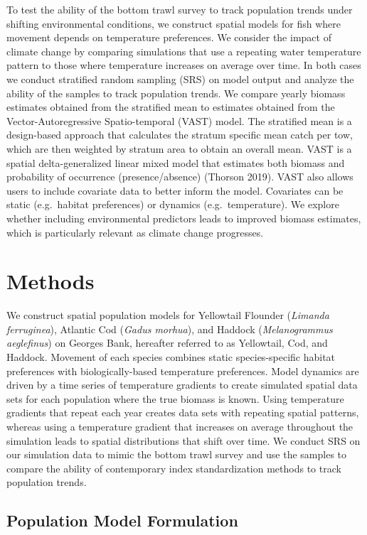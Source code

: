 \documentclass[
  12pt,
]{article}
\begin{document}
To test the ability of the bottom trawl survey to track population trends under shifting environmental conditions, we construct spatial models for fish where movement depends on temperature preferences. We consider the impact of climate change by comparing simulations that use a repeating water temperature pattern to those where temperature increases on average over time. In both cases we conduct stratified random sampling (SRS) on model output and analyze the ability of the samples to track population trends. We compare yearly biomass estimates obtained from the stratified mean to estimates obtained from the Vector-Autoregressive Spatio-temporal (VAST) model. The stratified mean is a design-based approach that calculates the stratum specific mean catch per tow, which are then weighted by stratum area to obtain an overall mean. VAST is a spatial delta-generalized linear mixed model that estimates both biomass and probability of occurrence (presence/absence) (Thorson 2019). VAST also allows users to include covariate data to better inform the model. Covariates can be static (e.g.~habitat preferences) or dynamics (e.g.~temperature). We explore whether including environmental predictors leads to improved biomass estimates, which is particularly relevant as climate change progresses.

\section{Methods}

We construct spatial population models for Yellowtail Flounder (\emph{Limanda ferruginea}), Atlantic Cod (\emph{Gadus morhua}), and Haddock (\emph{Melanogrammus aeglefinus}) on Georges Bank, hereafter referred to as Yellowtail, Cod, and Haddock. Movement of each species combines static species-specific habitat preferences with biologically-based temperature preferences. Model dynamics are driven by a time series of temperature gradients to create simulated spatial data sets for each population where the true biomass is known. Using temperature gradients that repeat each year creates data sets with repeating spatial patterns, whereas using a temperature gradient that increases on average throughout the simulation leads to spatial distributions that shift over time. We conduct SRS on our simulation data to mimic the bottom trawl survey and use the samples to compare the ability of contemporary index standardization methods to track population trends.

\subsection{Population Model Formulation}
\end{document}
